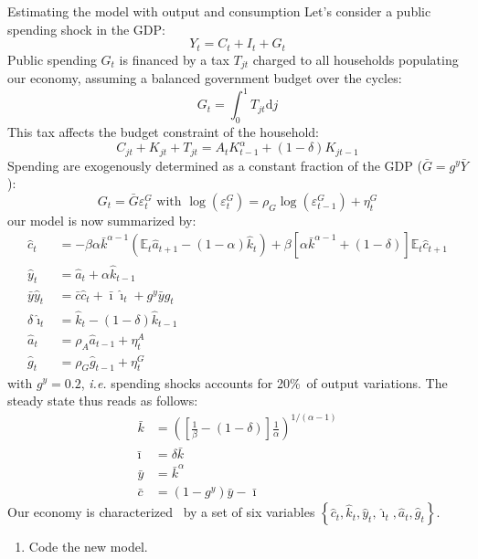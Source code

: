 \documentclass[a4paper,12pt]{article}%
\begin{document}
\begin{myexercise}{Estimating the model with output and consumption}
Let's consider a public spending shock in the GDP:%
\[
Y_{t}=C_{t}+I_{t}+G_{t}%
\]
Public spending $G_{t}$ is financed by a tax $T_{jt}$ charged to all
households populating our economy, assuming a balanced government budget over
the cycles:%
\[
G_{t}=%
{\displaystyle\int\nolimits_{0}^{1}}
T_{jt}\text{d}j
\]
This tax affects the budget constraint of the household:%
\[
C_{jt}+K_{jt}+T_{jt}=A_{t}K_{t-1}^{\alpha}+\left(  1-\delta\right)  K_{jt-1}%
\]
Spending are exogenously determined as a constant fraction of the GDP
($\bar{G}=g^{y}\bar{Y}$):%
\[
G_{t}=\bar{G}\varepsilon_{t}^{G}\text{ with }\log\left(  \varepsilon_{t}%
^{G}\right)  =\rho_{G}\log\left(  \varepsilon_{t-1}^{G}\right)  +\eta_{t}^{G}%
\]
our model is now summarized by: $\ $%
\begin{align}
\hat{c}_{t}  &  =-\beta\alpha\bar{k}^{\alpha-1}\left(  \mathbb{E}_{t}\hat
{a}_{t+1}-\left(  1-\alpha\right)  \hat{k}_{t}\right)  +\beta\left[
\alpha\bar{k}^{\alpha-1}+\left(  1-\delta\right)  \right]  \mathbb{E}_{t}%
\hat{c}_{t+1}\\
\hat{y}_{t}  &  =\hat{a}_{t}+\alpha\hat{k}_{t-1}\\
\bar{y}\hat{y}_{t}  &  =\bar{c}\hat{c}_{t}+\bar{\imath}\hat{\imath}_{t}%
+g^{y}\bar{y}\hat{g}_{t}\\
\delta\hat{\imath}_{t}  &  =\hat{k}_{t}-\left(  1-\delta\right)  \hat{k}%
_{t-1}\\
\hat{a}_{t}  &  =\rho_{A}\hat{a}_{t-1}+\eta_{t}^{A}\\
\hat{g}_{t}  &  =\rho_{G}\hat{g}_{t-1}+\eta_{t}^{G}%
\end{align}
with $g^{y}=0.2$, \textit{i.e.} spending shocks accounts for 20\%\ of output
variations. The steady state thus reads as follows:%
\begin{align*}
\bar{k}  &  =\left(  \left[  \frac{1}{\beta}-\left(  1-\delta\right)  \right]
\frac{1}{\alpha}\right)  ^{1/\left(  \alpha-1\right)  }\\
\bar{\imath}  &  =\delta\bar{k}\\
\bar{y}  &  =\bar{k}^{\alpha}\\
\bar{c}  &  =\left(  1-g^{y}\right)  \bar{y}-\bar{\imath}%
\end{align*}
Our economy is characterized \ by a set of six variables $\left\{  \hat{c}%
_{t},\hat{k}_{t},\hat{y}_{t},\hat{\imath}_{t},\hat{a}_{t},\hat{g}_{t}\right\}
$.

\begin{enumerate}
\item Code the new model.


\end{enumerate}
\end{myexercise}
\end{document}
